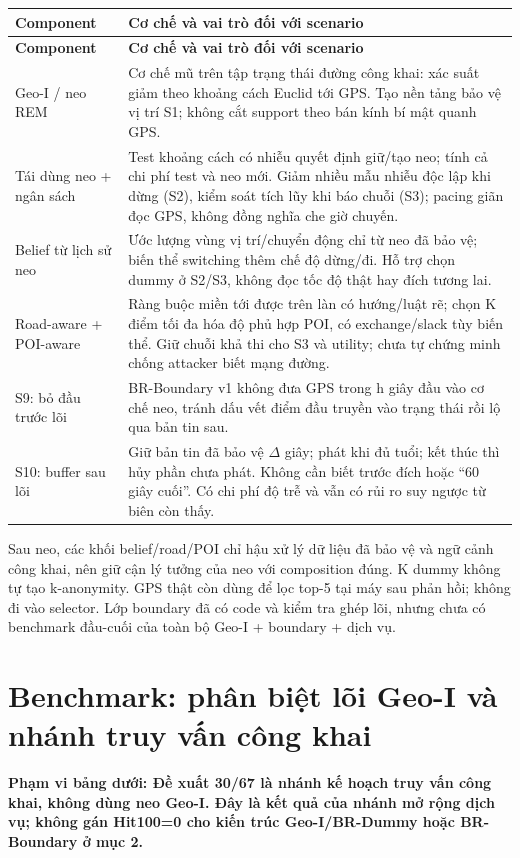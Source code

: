 \documentclass[10pt,a4paper]{article}
\newcommand{\key}[1]{\par\smallskip\noindent\colorbox{pale}{\parbox{\dimexpr\linewidth-2\fboxsep}{\textbf{#1}}}\par\smallskip}
\begin{document}
\begingroup\small
\begin{longtable}{@{}P{4.105cm}P{12.814cm}@{}}
\toprule
\textbf{Component} & \textbf{Cơ chế và vai trò đối với scenario}\\\midrule
\endfirsthead
\toprule
\textbf{Component} & \textbf{Cơ chế và vai trò đối với scenario}\\\midrule
\endhead
\bottomrule\endfoot
Geo-I / neo REM & Cơ chế mũ trên tập trạng thái đường công khai: xác suất giảm theo khoảng cách Euclid tới GPS. Tạo nền tảng bảo vệ vị trí S1; không cắt support theo bán kính bí mật quanh GPS.\\
\addlinespace[3pt]
Tái dùng neo + ngân sách & Test khoảng cách có nhiễu quyết định giữ/tạo neo; tính cả chi phí test và neo mới. Giảm nhiều mẫu nhiễu độc lập khi dừng (S2), kiểm soát tích lũy khi báo chuỗi (S3); pacing giãn đọc GPS, không đồng nghĩa che giờ chuyến.\\
\addlinespace[3pt]
Belief từ lịch sử neo & Ước lượng vùng vị trí/chuyển động chỉ từ neo đã bảo vệ; biến thể switching thêm chế độ dừng/đi. Hỗ trợ chọn dummy ở S2/S3, không đọc tốc độ thật hay đích tương lai.\\
\addlinespace[3pt]
Road-aware + POI-aware & Ràng buộc miền tới được trên làn có hướng/luật rẽ; chọn K điểm tối đa hóa độ phủ hợp POI, có exchange/slack tùy biến thể. Giữ chuỗi khả thi cho S3 và utility; chưa tự chứng minh chống attacker biết mạng đường.\\
\addlinespace[3pt]
S9: bỏ đầu trước lõi & BR-Boundary v1 không đưa GPS trong h giây đầu vào cơ chế neo, tránh dấu vết điểm đầu truyền vào trạng thái rồi lộ qua bản tin sau.\\
\addlinespace[3pt]
S10: buffer sau lõi & Giữ bản tin đã bảo vệ $\Delta$ giây; phát khi đủ tuổi; kết thúc thì hủy phần chưa phát. Không cần biết trước đích hoặc “60 giây cuối”. Có chi phí độ trễ và vẫn có rủi ro suy ngược từ biên còn thấy.\\
\end{longtable}
\endgroup
Sau neo, các khối belief/road/POI chỉ hậu xử lý dữ liệu đã bảo vệ và ngữ cảnh công khai, nên giữ cận lý tưởng của neo với composition đúng. K dummy không tự tạo k-anonymity. GPS thật còn dùng để lọc top-5 tại máy sau phản hồi; không đi vào selector. Lớp boundary đã có code và kiểm tra ghép lõi, nhưng chưa có benchmark đầu-cuối của toàn bộ Geo-I + boundary + dịch vụ.


\clearpage
\section{Benchmark: phân biệt lõi Geo-I và nhánh truy vấn công khai}\label{sec:3}
\key{Phạm vi bảng dưới: Đề xuất 30/67 là nhánh kế hoạch truy vấn công khai, không dùng neo Geo-I. Đây là kết quả của nhánh mở rộng dịch vụ; không gán Hit100=0 cho kiến trúc Geo-I/BR-Dummy hoặc BR-Boundary ở mục 2.}
\end{document}
